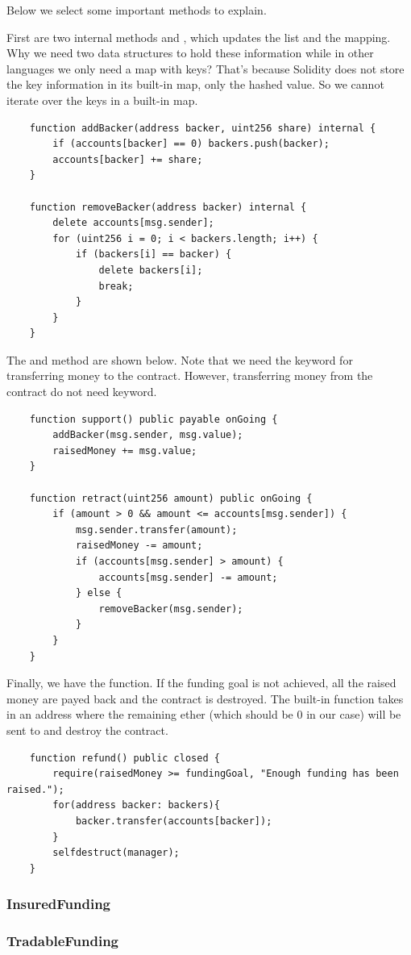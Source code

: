 \documentclass{article}
\begin{document}
Below we select some important methods to explain.

First are two internal methods  and , which updates the  list and the  mapping. Why we need two data structures to hold these information while in other languages we only need a map with keys? That's because Solidity does not store the key information in its built-in map, only the hashed value. So we cannot iterate over the keys in a built-in map.

\begin{lstlisting}
    function addBacker(address backer, uint256 share) internal {
        if (accounts[backer] == 0) backers.push(backer);
        accounts[backer] += share;
    }

    function removeBacker(address backer) internal {
        delete accounts[msg.sender];
        for (uint256 i = 0; i < backers.length; i++) {
            if (backers[i] == backer) {
                delete backers[i];
                break;
            }
        }
    }
\end{lstlisting}

The  and  method are shown below. Note that we need the  keyword for transferring money to the contract. However, transferring money from the contract do not need  keyword.
\begin{lstlisting}
    function support() public payable onGoing {
        addBacker(msg.sender, msg.value);
        raisedMoney += msg.value;
    }

    function retract(uint256 amount) public onGoing {
        if (amount > 0 && amount <= accounts[msg.sender]) {
            msg.sender.transfer(amount);
            raisedMoney -= amount;
            if (accounts[msg.sender] > amount) {
                accounts[msg.sender] -= amount;
            } else {
                removeBacker(msg.sender);
            }
        }
    }
\end{lstlisting}

Finally, we have the  function. If the funding goal is not achieved, all the raised money are payed back and the contract is destroyed. The built-in function  takes in an address where the remaining ether (which should be 0 in our case) will be sent to and destroy the contract.

\begin{lstlisting}
    function refund() public closed {
        require(raisedMoney >= fundingGoal, "Enough funding has been raised.");
        for(address backer: backers){
            backer.transfer(accounts[backer]);
        }
        selfdestruct(manager);
    }
\end{lstlisting}

\subsubsection{InsuredFunding}

\subsubsection{TradableFunding}

\end{document}
